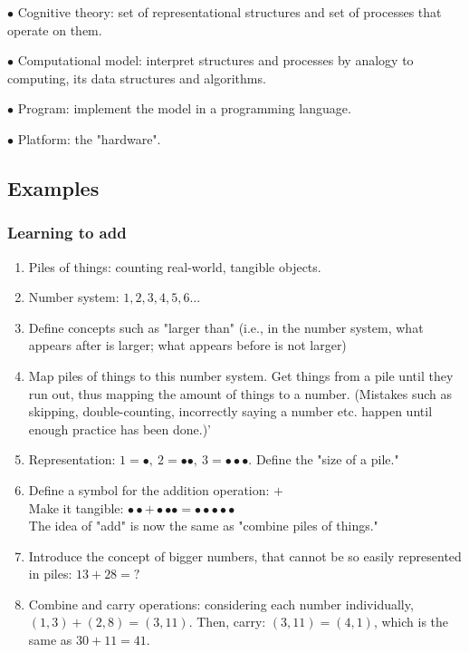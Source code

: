 \documentclass[english,openany]{book}
\begin{document}
$\bullet$ Cognitive theory: set of representational structures and set of processes that operate on them.

$\bullet$ Computational model: interpret structures and processes by analogy to computing, its data structures and algorithms.

$\bullet$ Program: implement the model in a programming language.

$\bullet$ Platform: the "hardware".

\subsection{Examples}

\subsubsection{Learning to add}

\begin{enumerate}
    \item Piles of things: counting real-world, tangible objects.

    \item Number system: $1, 2, 3, 4, 5, 6...$

    \item Define concepts such as "larger than" (i.e., in the number system, what appears after is larger; what appears before is not larger)

    \item Map piles of things to this number system. Get things from a pile until they run out, thus mapping the amount of things to a number. (Mistakes such as skipping, double-counting, incorrectly saying a number etc. happen until enough practice has been done.)'

    \item Representation: $1 = \bullet,\ 2 = \bullet \bullet,\ 3 = \bullet \bullet \bullet$. Define the "size of a pile."

    \item Define a symbol for the addition operation: $+$\\ Make it tangible: $\bullet \bullet + \bullet \bullet \bullet = \bullet \bullet \bullet \bullet \bullet$\\
    The idea of "add" is now the same as "combine piles of things."

    \item Introduce the concept of bigger numbers, that cannot be so easily represented in piles: $13 + 28 = ?$

    \item Combine and carry operations: considering each number individually, $(1, 3) + (2, 8) = (3, 11)$. Then, carry: $(3, 11) = (4, 1)$, which is the same as $30 + 11 = 41$.
\end{enumerate}
\end{document}
